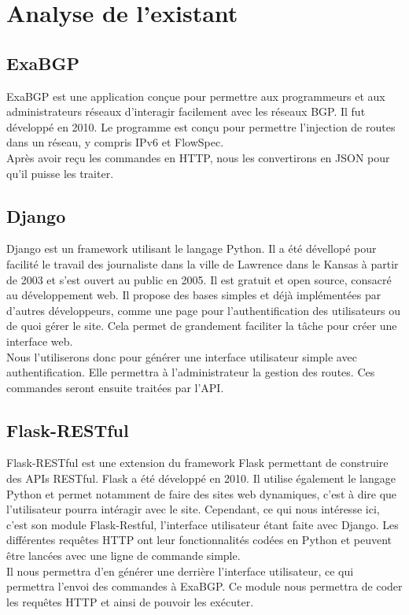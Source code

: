 \chapter{Analyse de l'existant}

\section{ExaBGP}
ExaBGP est une application conçue pour permettre aux programmeurs et aux administrateurs réseaux d’interagir facilement avec les réseaux BGP. Il fut développé en 2010. Le programme est conçu pour permettre l’injection de routes dans un réseau, y compris IPv6 et FlowSpec.
\cite{Man10} \\ \indent
Après avoir reçu les commandes en HTTP, nous les convertirons en JSON pour qu'il puisse les traiter.

\section{Django}
Django est un framework utilisant le langage Python. Il a été dévellopé pour facilité le travail des journaliste dans la ville de Lawrence dans le Kansas à partir de 2003 et s'est ouvert au public en 2005. Il est gratuit et open source, consacré au développement web. Il propose des bases simples et déjà implémentées par d'autres développeurs, comme une page pour l'authentification des utilisateurs ou de quoi gérer le site. Cela permet de grandement faciliter la tâche pour créer une interface web. \\ \indent Nous l'utiliserons donc pour générer une interface utilisateur simple avec authentification. Elle permettra à l'administrateur la gestion des routes. Ces commandes seront ensuite traitées par l'API.

\section{Flask-RESTful}
Flask-RESTful est une extension du framework Flask permettant de construire des APIs RESTful. Flask a été développé en 2010. Il utilise également le langage Python et permet notamment de faire des sites web dynamiques, c'est à dire que l'utilisateur pourra intéragir avec le site. Cependant, ce qui nous intéresse ici, c'est son module Flask-Restful, l'interface utilisateur étant faite avec Django. Les différentes requêtes HTTP ont leur fonctionnalités codées en Python et peuvent être lancées avec une ligne de commande simple.\\ \indent 
Il nous permettra d'en générer une derrière l'interface utilisateur, ce qui permettra l'envoi des commandes à ExaBGP. Ce module nous permettra de coder les requêtes HTTP et ainsi de pouvoir les exécuter.

